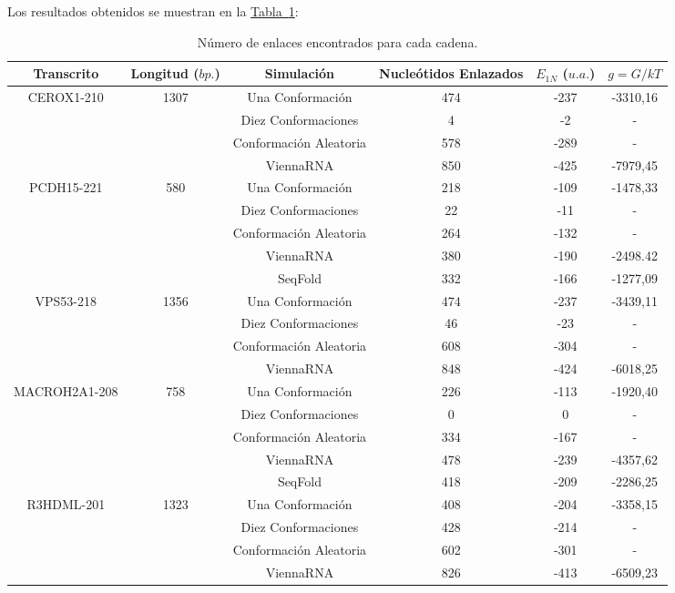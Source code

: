 \documentclass[a4paper,11pt,titlepage]{article}
\newcommand{\nr}[2][sección]{\hyperref[#2]{#1~\ref{#2}}}
\theoremstyle{definition}
\begin{document}
Los resultados obtenidos se muestran en la \nr[Tabla]{tab:linking}:

\begin{table}[H]
	\centering
    \begin{adjustbox}{width=0.80\textwidth}
	\begin{tabular}{cccccc}
	    \toprule
        Transcrito & Longitud ($bp.$) & Simulación & Nucleótidos Enlazados & $E_{1N}$ ($u.a.$) & $g = G/kT$ \\
		\midrule
        \multirow{4}{*}{CEROX1-210} & \multirow{4}{*}{1307} & Una Conformación & 474 & -237 & -3310,16 \\
        &  & Diez Conformaciones & 4 & -2 & - \\
        &  & Conformación Aleatoria & 578 & -289 & - \\
        &  & ViennaRNA & 850 & -425 & -7979,45 \\
        \midrule
        \multirow{5}{*}{PCDH15-221} & \multirow{5}{*}{580} & Una Conformación & 218 & -109 & -1478,33 \\
        &  & Diez Conformaciones & 22 & -11 & - \\
        &  & Conformación Aleatoria & 264 & -132 & - \\
        &  & ViennaRNA & 380 & -190 & -2498.42 \\
        &  & SeqFold & 332 & -166 & -1277,09 \\
        \midrule
        \multirow{4}{*}{VPS53-218} & \multirow{4}{*}{1356} & Una Conformación & 474 & -237 & -3439,11 \\
        &  & Diez Conformaciones & 46 & -23 & - \\
        &  & Conformación Aleatoria & 608 & -304 & - \\
        &  & ViennaRNA & 848 & -424 & -6018,25 \\
        \midrule
        \multirow{5}{*}{MACROH2A1-208} & \multirow{5}{*}{758} & Una Conformación & 226 & -113 & -1920,40 \\
        &  & Diez Conformaciones & 0 & 0 & - \\
        &  & Conformación Aleatoria & 334 & -167 & - \\
        &  & ViennaRNA & 478 & -239 & -4357,62 \\
        &  & SeqFold & 418 & -209 & -2286,25 \\
        \midrule
        \multirow{4}{*}{R3HDML-201} & \multirow{4}{*}{1323} & Una Conformación & 408 & -204 & -3358,15 \\
        &  & Diez Conformaciones & 428 & -214 & - \\
        &  & Conformación Aleatoria & 602 & -301 & - \\
        &  & ViennaRNA & 826 & -413 & -6509,23 \\
		\bottomrule
	\end{tabular}
    \end{adjustbox}
	\small{\caption{Número de enlaces encontrados para cada cadena.}\label{tab:linking}}\normalsize
\end{table}
\end{document}
